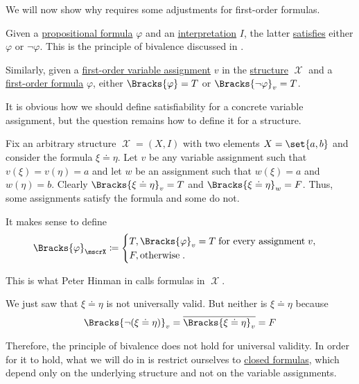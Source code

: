 \begin{remark}\label{rem:first_order_satisfiability_bivalence}
  We will now show why  requires some adjustments for first-order formulas.

  Given a \hyperref[def:propositional_syntax/formula]{propositional formula} \( \varphi \) and an \hyperref[def:propositional_valuation/interpretation]{interpretation} \( I \), the latter \hyperref[def:propositional_model]{satisfies} either \( \varphi \) or \( \neg \varphi \). This is the principle of bivalence discussed in .

  Similarly, given a \hyperref[def:first_order_valuation/variable_assignment]{first-order variable assignment} \( v \) in the \hyperref[def:first_order_structure]{structure} \( \mscrX \) and a \hyperref[def:first_order_syntax/formula]{first-order formula} \( \varphi \), either \( \Bracks{\varphi} = T \) or \( \Bracks{\neg \varphi}_v = T \).

  It is obvious how we should define satisfiability for a concrete variable assignment, but the question remains how to define it for a structure.

  Fix an arbitrary structure \( \mscrX = (X, I) \) with two elements \( X = \set{ a, b } \) and consider the formula \( \xi \doteq \eta \). Let \( v \) be any variable assignment such that \( v(\xi) = v(\eta) = a \) and let \( w \) be an assignment such that \( w(\xi) = a \) and \( w(\eta) = b \). Clearly \( \Bracks{\xi \doteq \eta}_v = T \) and \( \Bracks{\xi \doteq \eta}_w = F \). Thus, some assignments satisfy the formula and some do not.

  It makes sense to define
  \begin{equation*}
    \Bracks{\varphi}_\mscrX
    \coloneqq
    \begin{cases}
      T, \Bracks{\varphi}_v = T \T{for every assignment} v, \\
      F, \T{otherwise}.
    \end{cases}
  \end{equation*}

  This is what Peter Hinman in \cite[rem. 2.2.17]{Hinman2005} calls  formulas in \( \mscrX \).

  We just saw that \( \xi \doteq \eta \) is not universally valid. But neither is \( \xi \doteq \eta \) because
  \begin{equation*}
    \Bracks{\neg (\xi \doteq \eta)}_v = \overline{\Bracks{\xi \doteq \eta}_v} = F
  \end{equation*}

  Therefore, the principle of bivalence does not hold for universal validity. In order for it to hold, what we will do in  is restrict ourselves to \hyperref[def:first_order_syntax/closed_formula]{closed formulas}, which depend only on the underlying structure and not on the variable assignments.
\end{remark}


